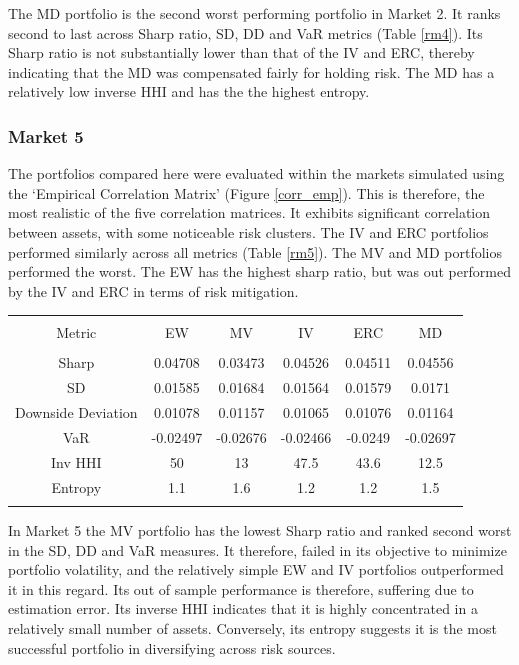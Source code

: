 \documentclass[11pt,preprint, authoryear]{elsarticle}
\let\origtable\table
\let\endorigtable\endtable
\renewenvironment{table}[1][2] {
    \expandafter\origtable\expandafter[H]
} {
    \endorigtable
}
\numberwithin{equation}{section}
\numberwithin{figure}{section}
\numberwithin{table}{section}
\begin{document}
The MD portfolio is the second worst performing portfolio in Market 2.
It ranks second to last across Sharp ratio, SD, DD and VaR metrics
(Table \ref{rm4}). Its Sharp ratio is not substantially lower than that
of the IV and ERC, thereby indicating that the MD was compensated fairly
for holding risk. The MD has a relatively low inverse HHI and has the
the highest entropy.

\hypertarget{market-5}{%
\subsubsection{Market 5}\label{market-5}}

The portfolios compared here were evaluated within the markets simulated
using the `Empirical Correlation Matrix' (Figure \ref{corr_emp}). This
is therefore, the most realistic of the five correlation matrices. It
exhibits significant correlation between assets, with some noticeable
risk clusters. The IV and ERC portfolios performed similarly across all
metrics (Table \ref{rm5}). The MV and MD portfolios performed the worst.
The EW has the highest sharp ratio, but was out performed by the IV and
ERC in terms of risk mitigation.

\begin{table}[!htbp] \centering 
  \caption{Market 5 - Portfolio Risk Metrics} 
  \label{rm5} 
\begin{tabular}{@{\extracolsep{5pt}} cccccc} 
\\[-1.8ex]\hline 
\hline \\[-1.8ex] 
Metric & EW & MV & IV & ERC & MD \\ 
\hline \\[-1.8ex] 
Sharp & 0.04708 & 0.03473 & 0.04526 & 0.04511 & 0.04556 \\ 
SD & 0.01585 & 0.01684 & 0.01564 & 0.01579 & 0.0171 \\ 
Downside Deviation & 0.01078 & 0.01157 & 0.01065 & 0.01076 & 0.01164 \\ 
VaR & -0.02497 & -0.02676 & -0.02466 & -0.0249 & -0.02697 \\ 
Inv HHI & 50 & 13 & 47.5 & 43.6 & 12.5 \\ 
Entropy & 1.1 & 1.6 & 1.2 & 1.2 & 1.5 \\ 
\hline \\[-1.8ex] 
\end{tabular} 
\end{table}

In Market 5 the MV portfolio has the lowest Sharp ratio and ranked
second worst in the SD, DD and VaR measures. It therefore, failed in its
objective to minimize portfolio volatility, and the relatively simple EW
and IV portfolios outperformed it in this regard. Its out of sample
performance is therefore, suffering due to estimation error. Its inverse
HHI indicates that it is highly concentrated in a relatively small
number of assets. Conversely, its entropy suggests it is the most
successful portfolio in diversifying across risk sources.
\end{document}

